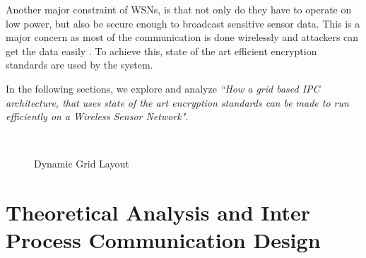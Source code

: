 \documentclass[conference]{IEEEtran}
\begin{document}
	Another major constraint of WSNs, is that not only do they have to operate on low power, but also be secure enough to broadcast sensitive sensor data. This is a major concern as most of the communication is done wirelessly and attackers can get the data easily \cite{wn}. To achieve this, state of the art efficient encryption standards are used by the system.
	
	In the following sections, we explore and analyze \textit{``How a grid based IPC architecture, that uses state of the art encryption standards can be made to run efficiently on a Wireless Sensor Network".} 
	
		\begin{figure}[!t]
		\centering
		\caption{Dynamic Grid Layout}
		\\
		\label{gridlay}
	\end{figure}

	\section{Theoretical Analysis and Inter Process Communication Design} \label{theoratical}
	
\end{document}
